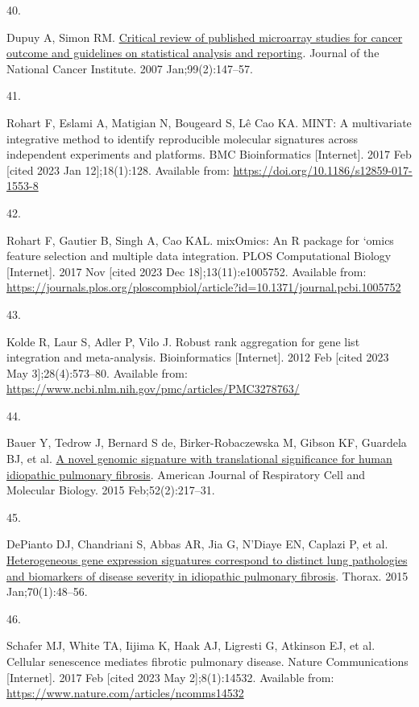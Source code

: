 \documentclass[
]{article}
\newlength{\cslhangindent}
\newlength{\csllabelwidth}
\newenvironment{CSLReferences}[2] %
 {\begin{list}{}{%
  \setlength{\itemindent}{0pt}
  \setlength{\leftmargin}{0pt}
  \setlength{\parsep}{0pt}
  \ifodd #1
   \setlength{\leftmargin}{\cslhangindent}
   \setlength{\itemindent}{-1\cslhangindent}
  \fi
  \setlength{\itemsep}{#2\baselineskip}}}
 {\end{list}}
\newcommand{\CSLLeftMargin}[1]{\parbox[t]{\csllabelwidth}{\strut#1\strut}}
\newcommand{\CSLRightInline}[1]{\parbox[t]{\linewidth - \csllabelwidth}{\strut#1\strut}}
\begin{document}
\begin{CSLReferences}{0}{1}
\CSLLeftMargin{40. }%
\CSLRightInline{Dupuy A, Simon RM. \href{https://doi.org/10.1093/jnci/djk018}{Critical review of published microarray studies for cancer outcome and guidelines on statistical analysis and reporting}. Journal of the National Cancer Institute. 2007 Jan;99(2):147--57. }

\CSLLeftMargin{41. }%
\CSLRightInline{Rohart F, Eslami A, Matigian N, Bougeard S, Lê Cao KA. {MINT}: A multivariate integrative method to identify reproducible molecular signatures across independent experiments and platforms. BMC Bioinformatics {[}Internet{]}. 2017 Feb {[}cited 2023 Jan 12{]};18(1):128. Available from: \url{https://doi.org/10.1186/s12859-017-1553-8}}

\CSLLeftMargin{42. }%
\CSLRightInline{Rohart F, Gautier B, Singh A, Cao KAL. {mixOmics}: {An} {R} package for `omics feature selection and multiple data integration. PLOS Computational Biology {[}Internet{]}. 2017 Nov {[}cited 2023 Dec 18{]};13(11):e1005752. Available from: \url{https://journals.plos.org/ploscompbiol/article?id=10.1371/journal.pcbi.1005752}}

\CSLLeftMargin{43. }%
\CSLRightInline{Kolde R, Laur S, Adler P, Vilo J. Robust rank aggregation for gene list integration and meta-analysis. Bioinformatics {[}Internet{]}. 2012 Feb {[}cited 2023 May 3{]};28(4):573--80. Available from: \url{https://www.ncbi.nlm.nih.gov/pmc/articles/PMC3278763/}}

\CSLLeftMargin{44. }%
\CSLRightInline{Bauer Y, Tedrow J, Bernard S de, Birker-Robaczewska M, Gibson KF, Guardela BJ, et al. \href{https://doi.org/10.1165/rcmb.2013-0310OC}{A novel genomic signature with translational significance for human idiopathic pulmonary fibrosis}. American Journal of Respiratory Cell and Molecular Biology. 2015 Feb;52(2):217--31. }

\CSLLeftMargin{45. }%
\CSLRightInline{DePianto DJ, Chandriani S, Abbas AR, Jia G, N'Diaye EN, Caplazi P, et al. \href{https://doi.org/10.1136/thoraxjnl-2013-204596}{Heterogeneous gene expression signatures correspond to distinct lung pathologies and biomarkers of disease severity in idiopathic pulmonary fibrosis}. Thorax. 2015 Jan;70(1):48--56. }

\CSLLeftMargin{46. }%
\CSLRightInline{Schafer MJ, White TA, Iijima K, Haak AJ, Ligresti G, Atkinson EJ, et al. Cellular senescence mediates fibrotic pulmonary disease. Nature Communications {[}Internet{]}. 2017 Feb {[}cited 2023 May 2{]};8(1):14532. Available from: \url{https://www.nature.com/articles/ncomms14532}}


\end{CSLReferences}
\end{document}
